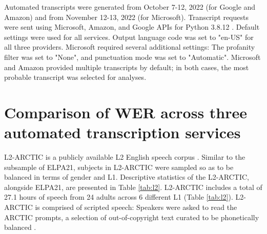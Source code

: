 \documentclass [PhD] {uclathes}
\begin{document}
Automated transcripts were generated from October 7-12, 2022 (for Google and Amazon) and from November 12-13, 2022 (for Microsoft). Transcript requests were sent using Microsoft, Amazon, and Google APIs for Python 3.8.12 \cite{python2022}. Default settings were used for all services. Output language code was set to "en-US" for all three providers. Microsoft required several additional settings: The profanity filter was set to "None", and punctuation mode was set to "Automatic". Microsoft and Amazon provided multiple transcripts by default; in both cases, the most probable transcript was selected for analyses. 

\section{Comparison of WER across three automated transcription services}
\label{sec:appendix_l2}

L2-ARCTIC is a publicly available L2 English speech corpus \cite{zhao2018l2}. Similar to the subsample of ELPA21, subjects in L2-ARCTIC were sampled so as to be balanced in terms of gender and L1. Descriptive statistics of the L2-ARCTIC, alongside ELPA21, are presented in Table \ref{tab:l2}. L2-ARCTIC includes a total of 27.1 hours of speech from 24 adults across 6 different L1 (Table \ref{tab:l2}). L2-ARCTIC is comprised of scripted speech: Speakers were asked to read the ARCTIC prompts, a selection of out-of-copyright text curated to be phonetically balanced \cite{kominek2003}. 
\end{document}

